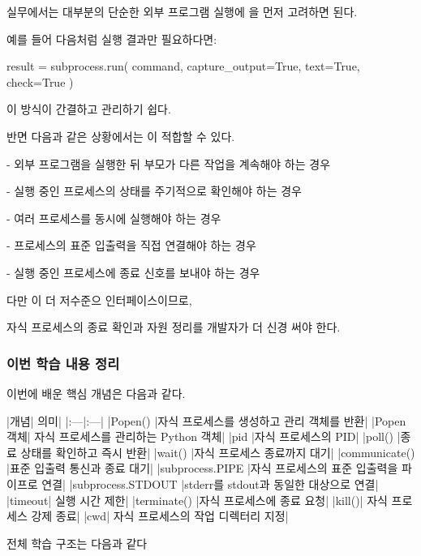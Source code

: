 실무에서는 대부분의 단순한 외부 프로그램 실행에 을 먼저 고려하면 된다.

예를 들어 다음처럼 실행 결과만 필요하다면:

\begin{dhkcode}
result = subprocess.run(
    command,
    capture_output=True,
    text=True,
    check=True
)
\end{dhkcode}

이 방식이 간결하고 관리하기 쉽다.

반면 다음과 같은 상황에서는 이 적합할 수 있다.

\begin{dhksmry}
- 외부 프로그램을 실행한 뒤 부모가 다른 작업을 계속해야 하는 경우

- 실행 중인 프로세스의 상태를 주기적으로 확인해야 하는 경우

- 여러 프로세스를 동시에 실행해야 하는 경우

- 프로세스의 표준 입출력을 직접 연결해야 하는 경우

- 실행 중인 프로세스에 종료 신호를 보내야 하는 경우
\end{dhksmry}

다만 이 더 저수준으 인터페이스이므로,

자식 프로세스의 종료 확인과 자원 정리를 개발자가 더 신경 써야 한다.

\subsubsection{이번 학습 내용 정리}

이번에 배운 핵심 개념은 다음과 같다.

\begin{dhktable}
|개념|	의미|
|:---|:---|
|Popen()	|자식 프로세스를 생성하고 관리 객체를 반환|
|Popen 객체|	자식 프로세스를 관리하는 Python 객체|
|pid	|자식 프로세스의 PID|
|poll()	|종료 상태를 확인하고 즉시 반환|
|wait()	|자식 프로세스 종료까지 대기|
|communicate()	|표준 입출력 통신과 종료 대기|
|subprocess.PIPE	|자식 프로세스의 표준 입출력을 파이프로 연결|
|subprocess.STDOUT	|stderr를 stdout과 동일한 대상으로 연결|
|timeout|	실행 시간 제한|
|terminate()	|자식 프로세스에 종료 요청|
|kill()|	자식 프로세스 강제 종료|
|cwd|	자식 프로세스의 작업 디렉터리 지정|
\end{dhktable}

전체 학습 구조는 다음과 같다

